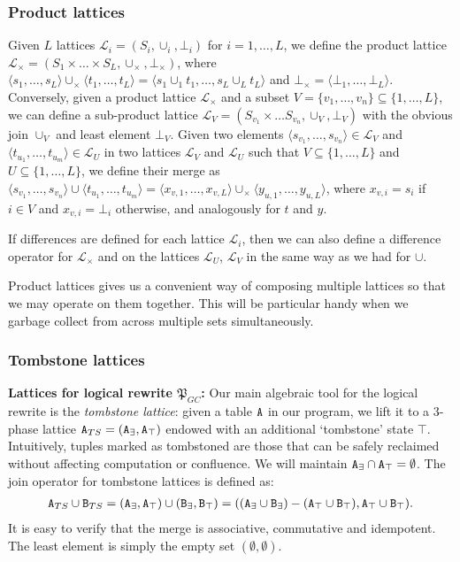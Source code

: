 \documentclass{article}
\numberwithin{equation}{section}
\renewcommand{\tt}[1]{\ifmmode\text{\texttt{#1}}\else\texttt{#1}\fi}
\begin{document}
\subsubsection{Product lattices}
Given $L$ lattices $\mathcal{L}_i = (S_i, \cup_i, \bot_i)$ for $i = 1, \dots, L$, we define the product lattice $\mathcal{L}_\times = \left(S_1 \times \dots \times S_L, \cup_\times, \bot_\times\right)$, where $\langle s_1, \dots, s_L \rangle \cup_\times \langle t_1, \dots, t_L \rangle = \langle s_1 \cup_1 t_1, \dots, s_L \cup_L t_L \rangle$ and $\bot_\times = \langle \bot_1, \dots, \bot_L \rangle$.
Conversely, given a product lattice $\mathcal{L}_\times$ and a subset $V =\{v_1, \dots, v_n\} \subseteq \{1, \dots, L\}$, we can define a sub-product lattice $\mathcal{L}_V = (S_{v_1} \times \dots S_{v_n}, \cup_V, \bot_V)$ with the obvious join $\cup_V$ and least element $\bot_V$.
Given two elements $\langle s_{v_1}, \dots, s_{v_n}\rangle \in \mathcal{L}_V$ and $\langle t_{u_1}, \dots, t_{u_m}\rangle \in \mathcal{L}_U$ in two lattices $\mathcal{L}_V$ and $\mathcal{L}_U$ such that $V \subseteq \{1,\dots,L\}$ and $U \subseteq \{1,\dots,L\}$, we define their merge as
$\langle s_{v_1}, \dots, s_{v_n}\rangle \cup \langle t_{u_1}, \dots, t_{u_m}\rangle = \langle x_{v,1}, \dots, x_{v,L} \rangle \cup_\times \langle y_{u,1}, \dots, y_{u,L} \rangle$,
where $x_{v,i} = s_i$ if $i \in V$ and $x_{v,i} = \bot_i$ otherwise, and analogously for $t$ and $y$.

If differences are defined for each lattice $\mathcal{L}_i$, then we can also define a difference operator for $\mathcal{L}_\times$ and on the lattices $\mathcal{L}_U$, $\mathcal{L}_V$ in the same way as we had for $\cup$.

Product lattices gives us a convenient way of composing multiple lattices so that we may operate on them together.
This will be particular handy when we garbage collect from across multiple sets simultaneously.


\subsubsection{Tombstone lattices}
\textbf{Lattices for logical rewrite $\mathfrak{P}_{GC}$:}
Our main algebraic tool for the logical rewrite is the \emph{tombstone lattice}:
given a table $\tt{A}$ in our program, we lift it to a 3-phase lattice $\tt{A}_{TS} = (\tt{A}_\exists, \tt{A}_\top)$ endowed with an additional `tombstone' state $\top$.
Intuitively, tuples marked as tombstoned are those that can be safely reclaimed without affecting computation or confluence.
We will maintain $\tt{A}_\exists \cap \tt{A}_\top = \emptyset$.
The join operator for tombstone lattices is defined as:
\begin{align*}
\tt{A}_{TS} \cup \tt{B}_{TS} = (\tt{A}_\exists, \tt{A}_\top) \cup (\tt{B}_\exists, \tt{B}_\top) = ((\tt{A}_\exists \cup \tt{B}_\exists) - (\tt{A}_\top \cup \tt{B}_\top), \tt{A}_\top \cup \tt{B}_\top).
\end{align*}
It is easy to verify that the merge is associative, commutative and idempotent.
The least element is simply the empty set $(\emptyset, \emptyset)$.
\end{document}
